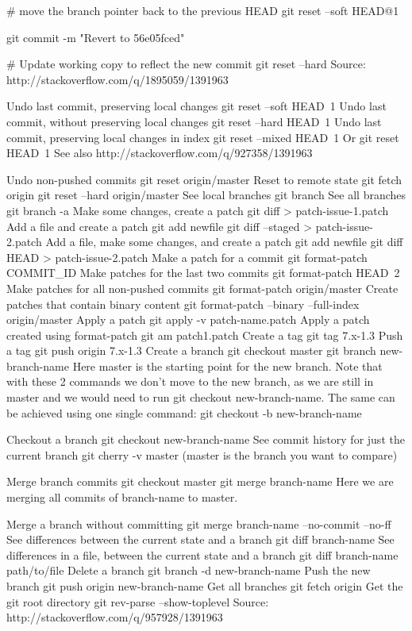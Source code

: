 # move the branch pointer back to the previous HEAD
git reset --soft HEAD@{1}

git commit -m "Revert to 56e05fced"

# Update working copy to reflect the new commit
git reset --hard
Source: http://stackoverflow.com/q/1895059/1391963

Undo last commit, preserving local changes
git reset --soft HEAD~1
Undo last commit, without preserving local changes
git reset --hard HEAD~1
Undo last commit, preserving local changes in index
git reset --mixed HEAD~1
Or git reset HEAD~1
See also http://stackoverflow.com/q/927358/1391963

Undo non-pushed commits
git reset origin/master
Reset to remote state
git fetch origin
git reset --hard origin/master
See local branches
git branch
See all branches
git branch -a
Make some changes, create a patch
git diff > patch-issue-1.patch
Add a file and create a patch
git add newfile
git diff --staged > patch-issue-2.patch
Add a file, make some changes, and create a patch
git add newfile
git diff HEAD > patch-issue-2.patch
Make a patch for a commit
git format-patch COMMIT_ID
Make patches for the last two commits
git format-patch HEAD~2
Make patches for all non-pushed commits
git format-patch origin/master
Create patches that contain binary content
git format-patch --binary --full-index origin/master
Apply a patch
git apply -v patch-name.patch
Apply a patch created using format-patch
git am patch1.patch
Create a tag
git tag 7.x-1.3
Push a tag
git push origin 7.x-1.3
Create a branch
git checkout master
git branch new-branch-name
Here master is the starting point for the new branch. Note that with these 2 commands we don't move to the new branch, as we are still in master and we would need to run git checkout new-branch-name. The same can be achieved using one single command: git checkout -b new-branch-name

Checkout a branch
git checkout new-branch-name
See commit history for just the current branch
git cherry -v master
(master is the branch you want to compare)

Merge branch commits
git checkout master
git merge branch-name
Here we are merging all commits of branch-name to master.

Merge a branch without committing
git merge branch-name --no-commit --no-ff
See differences between the current state and a branch
git diff branch-name
See differences in a file, between the current state and a branch
git diff branch-name path/to/file
Delete a branch
git branch -d new-branch-name
Push the new branch
git push origin new-branch-name
Get all branches
git fetch origin
Get the git root directory
git rev-parse --show-toplevel
Source: http://stackoverflow.com/q/957928/1391963

